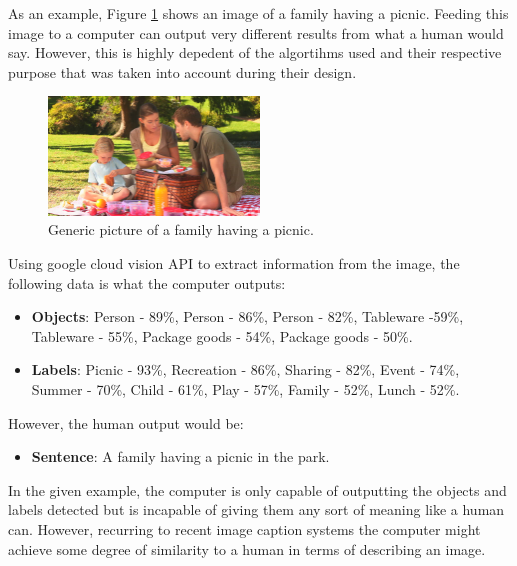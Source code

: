     \par As an example, Figure \ref{fig:picnic} shows an image of a family having a picnic. Feeding this image to a computer can output very different results from what a human would say. However, this is highly depedent of the algortihms used and their respective purpose that was taken into account during their design.

    \begin{figure}[H]
        \centering
        \captionsetup{justification=centering}
        \includegraphics[width=0.5\textwidth]{Sections/2StateOfTheArt/2_images/picinic.png}
        \caption{Generic picture of a family having a picnic.}
        \label{fig:picnic}  
    \end{figure}

    Using google cloud vision API \cite{google} to extract information from the image, the following data is what the computer outputs:

    \begin{itemize}
        \item \textbf{Objects}: Person - 89\%, Person - 86\%, Person - 82\%, Tableware -59\%, Tableware - 55\%, Package goods - 54\%, Package goods - 50\%. 
        \item \textbf{Labels}: Picnic - 93\%, Recreation - 86\%, Sharing - 82\%, Event - 74\%, Summer - 70\%, Child - 61\%, Play - 57\%, Family - 52\%, Lunch - 52\%.
    \end{itemize}
   
   However, the human output would be: 
   
   \begin{itemize}
       \item \textbf{Sentence}: A family having a picnic in the park.
   \end{itemize}

    
   
    In the given example, the computer is only capable of outputting the objects and labels detected but is incapable of giving them any sort of meaning like a human can. However, recurring to recent image caption systems the computer might achieve some degree of similarity to a human in terms of describing an image.



